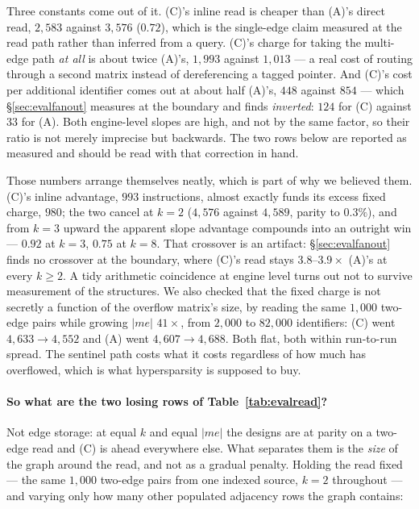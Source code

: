 \documentclass[11pt,a4paper]{article}
\theoremstyle{plain}
\theoremstyle{definition}
\theoremstyle{remark}
\begin{document}
Three constants come out of it. (C)'s inline read is cheaper than (A)'s direct
read, $2{,}583$ against $3{,}576$ ($0.72$), which is the single-edge claim
measured at the read path rather than inferred from a query. (C)'s charge for
taking the multi-edge path \emph{at all} is about twice (A)'s, $1{,}993$
against $1{,}013$ --- a real cost of routing through a second matrix instead of
dereferencing a tagged pointer. And (C)'s cost per additional identifier comes out at
about half (A)'s, $448$ against $854$ --- which \S\ref{sec:evalfanout} measures
at the boundary and finds \emph{inverted}: $124$ for (C) against $33$ for (A).
Both engine-level slopes are high, and not by the same factor, so their ratio is
not merely imprecise but backwards. The two rows below are reported as measured
and should be read with that correction in hand.

Those numbers arrange themselves neatly, which is part of why we believed them.
(C)'s inline advantage, $993$ instructions, almost exactly funds its excess fixed
charge, $980$; the two cancel at $k = 2$ ($4{,}576$ against $4{,}589$, parity to
$0.3\%$), and from $k = 3$ upward the apparent slope advantage compounds into an
outright win --- $0.92$ at $k = 3$, $0.75$ at $k = 8$. That crossover is an
artifact: \S\ref{sec:evalfanout} finds no crossover at the boundary, where (C)'s
read stays $3.8$--$3.9\times$ (A)'s at every $k \ge 2$. A tidy arithmetic
coincidence at engine level turns out not to survive measurement of the
structures. We also checked that the fixed charge is not
secretly a function of the overflow matrix's size, by reading the same
$1{,}000$ two-edge pairs while growing $|me|$ $41\times$, from $2{,}000$ to
$82{,}000$ identifiers: (C) went $4{,}633 \to 4{,}552$ and (A) went
$4{,}607 \to 4{,}688$. Both flat, both within run-to-run spread. The sentinel
path costs what it costs regardless of how much has overflowed, which is what
hypersparsity is supposed to buy.

\paragraph{So what are the two losing rows of Table~\ref{tab:evalread}?} Not
edge storage: at equal $k$ and equal $|me|$ the designs are at parity on a
two-edge read and (C) is ahead everywhere else. What separates them is the
\emph{size} of the graph around the read, and not as a gradual penalty. Holding
the read fixed --- the same $1{,}000$ two-edge pairs from one indexed source,
$k = 2$ throughout --- and varying only how many other populated adjacency rows
the graph contains:
\end{document}
